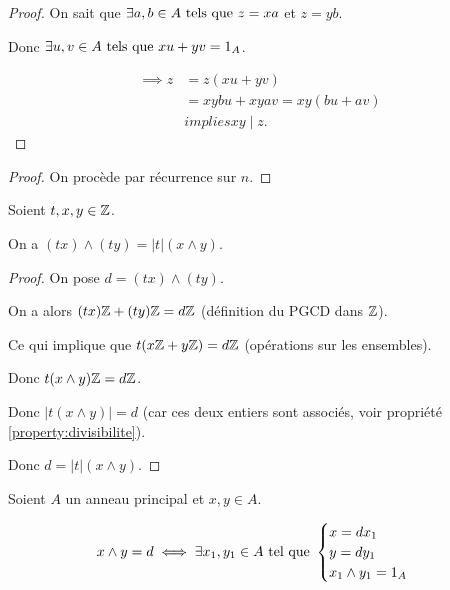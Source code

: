 \documentclass[12pt,a4paper]{report}
\begin{document}
\begin{proof}
    On sait que $\exists a,b \in A \text{ tels que } z = xa$ et $z=yb$.

    Donc $\exists u,v \in A \text{ tels que } xu + yv = 1_A$.

    \begin{align*}
        \implies z &= z(xu + yv)\\
        &= xybu + xyav = xy(bu + av)\\
        &implies xy \mid z.
    \end{align*}
\end{proof}

\begin{proof}
    On procède par récurrence sur $n$.
\end{proof}

\begin{property}
    Soient $t,x,y \in \mathbb{Z}$.

    On a $(tx)\wedge (ty) = |t| (x \wedge y)$.
\end{property}

\begin{proof}
    On pose $d=(tx)\wedge (ty)$.

    On a alors $(tx)\mathbb{Z} + (ty)\mathbb{Z} = d\mathbb{Z}$ (définition du PGCD dans $\mathbb{Z}$).

    Ce qui implique que $t(x\mathbb{Z} + y\mathbb{Z}) = d\mathbb{Z}$ (opérations sur les ensembles).

    Donc $t(x \wedge y)\mathbb{Z} = d\mathbb{Z}$.

    Donc $|t(x \wedge y)| = d$ (car ces deux entiers sont associés, voir propriété \ref{property:divisibilite}).

    Donc $d = |t| (x \wedge y)$.
\end{proof}

\begin{property}
    Soient $A$ un anneau principal et $x,y \in A$.

    $$x\wedge y = d \iff \exists x_1,y_1 \in A \text{ tel que } \begin{cases}
        x = dx_1\\
        y= dy_1\\
        x_1 \wedge y_1 = 1_A
    \end{cases}$$
\end{property}
\end{document}
